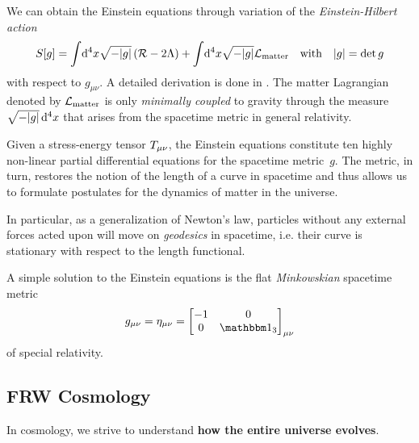 \documentclass[parskip=half]{scrreprt}
\begin{document}
We can obtain the Einstein equations through variation of the \emph{Einstein-Hilbert action}
\begin{align}\label{eq:einstein_hilbert_action}
	S[g] = \int \! \dif{^4x} \sqrt{-\metrdet{g}} \del{\Rscal - 2\cosmconst} + \int \! \dif{^4x} \sqrt{-\metrdet{g}} \lagrdensmatter \quad \text{with} \quad \metrdet{g} = \det{g}
\end{align}
with respect to \(g_{\mu \nu}\). A detailed derivation is done in . The matter Lagrangian denoted by \(\mathcal{L}_\textnormal{matter}\) is only \emph{minimally coupled} to gravity through the measure \(\sqrt{-\metrdet{g}}\dif{^4x}\) that arises from the spacetime metric in general relativity.

Given a stress-energy tensor \(T_{\mu \nu}\), the Einstein equations constitute ten  highly non-linear partial differential equations for the spacetime metric~\(g\). The metric, in turn, restores the notion of the length of a curve in spacetime and thus allows us to formulate postulates for the dynamics of matter in the universe.

In particular, as a generalization of Newton's law, particles without any external forces acted upon will move on \emph{geodesics} in spacetime, i.e. their curve is stationary with respect to the length functional.

A simple solution to the Einstein equations  is the flat \emph{Minkowskian} spacetime metric
\begin{equation}
	g_{\mu \nu} = \eta_{\mu \nu} =
	\begin{bmatrix}
		-1 & 0 \\
		0 & \idmat_3
	\end{bmatrix}_{\mu \nu}
\end{equation}
of special relativity.


\subsection{FRW Cosmology}\label{sec:frw}

In cosmology, we strive to understand \textbf{how the entire universe evolves}.
\end{document}
